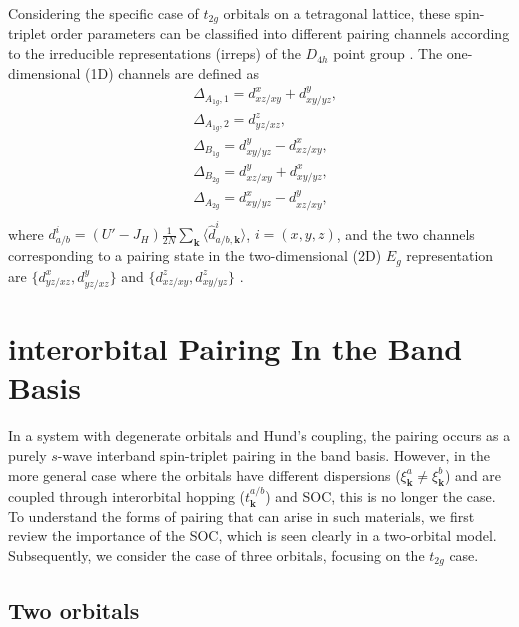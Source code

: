 \documentclass[%
reprint,
superscriptaddress,
 amsmath,amssymb,
 aps,
prb,
nobalancelastpage,
]{revtex4-2}
\begin{document}
Considering the specific case of $t_{2g}$ orbitals on a tetragonal lattice, these spin-triplet order parameters can be classified into different pairing channels according to the irreducible representations (irreps) of the $D_{4h}$ point group \cite{Ramires2019PRB, Suh2019}. The one-dimensional (1D) channels are defined as
\begin{equation}
\label{pairing_irreps}
    \begin{aligned}
        &\Delta_{A_{1g},1} = d^{x}_{xz/xy}+d^{y}_{xy/yz},\\[6pt]
        &\Delta_{A_{1g},2} = d^{z}_{yz/xz},\\[6pt]
        &\Delta_{B_{1g}} = d^{y}_{xy/yz}-d^{x}_{xz/xy},\\[6pt]
        &\Delta_{B_{2g}} = d^{y}_{xz/xy}+d^{x}_{xy/yz},\\[6pt]
        &\Delta_{A_{2g}} = d^{x}_{xy/yz}-d^{y}_{xz/xy},\\[6pt]
    \end{aligned}
\end{equation}
where $d^{i}_{a/b} = (U'-J_{H})\frac{1}{2N}\sum_{\textbf{k}}\langle{\hat{d}^{i}_{a/b,\textbf{k}}}\rangle$, $i=(x,y,z)$, and the two channels corresponding to a pairing state in the two-dimensional (2D) $E_{g}$ representation are $\displaystyle \{d_{yz/xz}^{x}, d_{yz/xz}^{y}\}$ and $\displaystyle \{d_{xz/xy}^{z}, d_{xy/yz}^{z}\}$ \cite{Ramires2019PRB,Suh2019}.







\section{\label{Three}interorbital Pairing In the Band Basis}

In a system with degenerate orbitals and Hund's coupling, the pairing occurs as a purely $s$-wave interband spin-triplet pairing in the band basis. However, in the more general case where the orbitals have different dispersions ($\xi_{\textbf{k}}^{a}\neq\xi_{\textbf{k}}^{b}$) and are coupled through interorbital hopping ($t_{\textbf{k}}^{a/b}$) and SOC, this is no longer the case. To understand the forms of pairing that can arise in such materials, we first review the importance of the SOC, which is seen clearly in a two-orbital model. Subsequently, we consider the case of three orbitals, focusing on the $t_{2g}$ case.


\subsection{Two orbitals}
\end{document}
